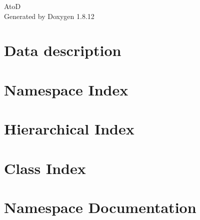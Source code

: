 \documentclass[twoside]{book}
\newcommand{\+}{\discretionary{\mbox{\scriptsize$\hookleftarrow$}}{}{}}
\newcommand{\clearemptydoublepage}{%
  \newpage{\pagestyle{empty}\cleardoublepage}%
}
\begin{document}
\hypersetup{pageanchor=false,
             bookmarksnumbered=true,
             pdfencoding=unicode
            }
\begin{titlepage}
\vspace*{7cm}
\begin{center}%
{\Large AtoD }\\
\vspace*{1cm}
{\large Generated by Doxygen 1.8.12}\\
\end{center}
\end{titlepage}
\clearemptydoublepage
{}
\tableofcontents
\clearemptydoublepage
{}
\hypersetup{pageanchor=true}

\chapter{Data description}
\label{md_atod_data__r_e_a_d_m_e}
\hypertarget{md_atod_data__r_e_a_d_m_e}{}

\chapter{Namespace Index}

\chapter{Hierarchical Index}

\chapter{Class Index}

\chapter{Namespace Documentation}











\end{document}
